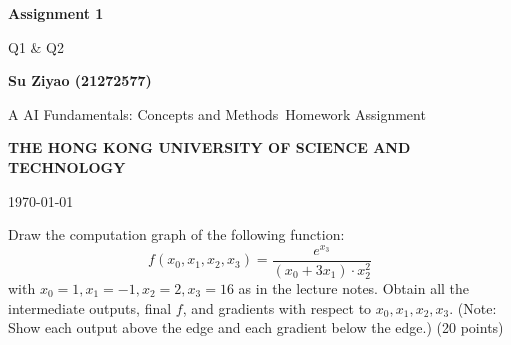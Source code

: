 \documentclass[10pt, a4paper]{article}
\newcommand\course{AI Fundamentals: Concepts and Methods}
\newcommand\hwnumber{1}
\newcommand\Information{Su Ziyao (21272577)}
\begin{document}
\begin{titlepage}
    \begin{center}
        \vspace*{3cm}
            
        \Huge
        \textbf{Assignment \hwnumber}
            
        \vspace{1cm}
        \huge
        Q1 \& Q2
            
        \vspace{1.5cm}
        \Large
            
        \textbf{\Information}
        
            
        \vfill
        
        A \course \ Homework Assignment
            
        \vspace{1cm}
            
        \textbf{\large THE HONG KONG UNIVERSITY OF SCIENCE AND TECHNOLOGY}
        \\
        
        \Large
        
        \today
            
    \end{center}
\end{titlepage}

\newpage

\begin{Problem}
Draw the computation graph of the following function:
$$f(x_0, x_1, x_2, x_3) = \frac{e^{x_3}}{(x_0 + 3x_1) \cdot x_2^2}$$
with $x_0 = 1, x_1 = -1, x_2 = 2, x_3 = 16$ as in the lecture notes. Obtain all the intermediate outputs, final $f$, and gradients with respect to $x_0, x_1, x_2, x_3$. (Note: Show each output above the edge and each gradient below the edge.) (20 points)
\end{Problem}
\end{document}
